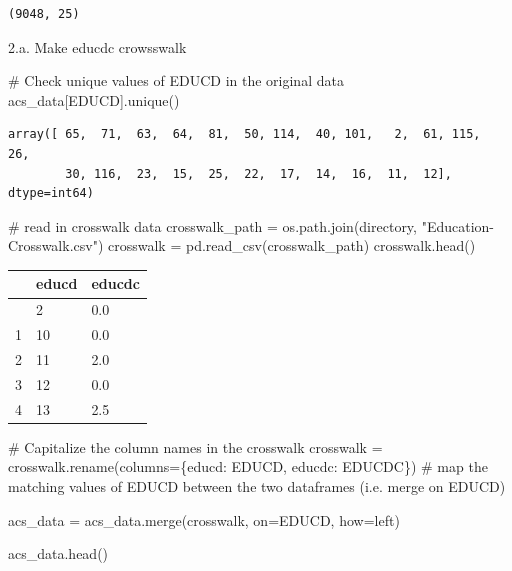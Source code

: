 \documentclass[
  11pt,
  letterpaper,
  DIV=11,
  numbers=noendperiod]{scrartcl}
\newenvironment{Shaded}{\begin{snugshade}}{\end{snugshade}}
\newcommand{\CommentTok}[1]{\textcolor[rgb]{0.37,0.37,0.37}{#1}}
\newcommand{\NormalTok}[1]{\textcolor[rgb]{0.00,0.23,0.31}{#1}}
\newcommand{\OperatorTok}[1]{\textcolor[rgb]{0.37,0.37,0.37}{#1}}
\newcommand{\StringTok}[1]{\textcolor[rgb]{0.13,0.47,0.30}{#1}}
\begin{document}
\begin{verbatim}
(9048, 25)
\end{verbatim}

2.a. Make educdc crowsswalk

\begin{Shaded}
\begin{Highlighting}[]
\CommentTok{\# Check unique values of EDUCD in the original data}
\NormalTok{acs\_data[}\StringTok{\textquotesingle{}EDUCD\textquotesingle{}}\NormalTok{].unique()}
\end{Highlighting}
\end{Shaded}

\begin{verbatim}
array([ 65,  71,  63,  64,  81,  50, 114,  40, 101,   2,  61, 115,  26,
        30, 116,  23,  15,  25,  22,  17,  14,  16,  11,  12], dtype=int64)
\end{verbatim}

\begin{Shaded}
\begin{Highlighting}[]
\CommentTok{\# read in crosswalk data}
\NormalTok{crosswalk\_path }\OperatorTok{=}\NormalTok{ os.path.join(directory, }\StringTok{"Education{-}Crosswalk.csv"}\NormalTok{)}
\NormalTok{crosswalk }\OperatorTok{=}\NormalTok{ pd.read\_csv(crosswalk\_path)}
\NormalTok{crosswalk.head()}
\end{Highlighting}
\end{Shaded}

\begin{longtable}[]{@{}lll@{}}
\toprule\noalign{}
& educd & educdc \\
\midrule\noalign{}
\endhead
\bottomrule\noalign{}
\endlastfoot
0 & 2 & 0.0 \\
1 & 10 & 0.0 \\
2 & 11 & 2.0 \\
3 & 12 & 0.0 \\
4 & 13 & 2.5 \\
\end{longtable}

\begin{Shaded}
\begin{Highlighting}[]
\CommentTok{\# Capitalize the column names in the crosswalk }
\NormalTok{crosswalk }\OperatorTok{=}\NormalTok{ crosswalk.rename(columns}\OperatorTok{=}\NormalTok{\{}\StringTok{\textquotesingle{}educd\textquotesingle{}}\NormalTok{: }\StringTok{\textquotesingle{}EDUCD\textquotesingle{}}\NormalTok{, }\StringTok{\textquotesingle{}educdc\textquotesingle{}}\NormalTok{: }\StringTok{\textquotesingle{}EDUCDC\textquotesingle{}}\NormalTok{\})}
\CommentTok{\# map the matching values of EDUCD between the two dataframes (i.e. merge on EDUCD)}

\NormalTok{acs\_data }\OperatorTok{=}\NormalTok{ acs\_data.merge(crosswalk, on}\OperatorTok{=}\StringTok{\textquotesingle{}EDUCD\textquotesingle{}}\NormalTok{, how}\OperatorTok{=}\StringTok{\textquotesingle{}left\textquotesingle{}}\NormalTok{) }

\NormalTok{acs\_data.head()}
\end{Highlighting}
\end{Shaded}
\end{document}
